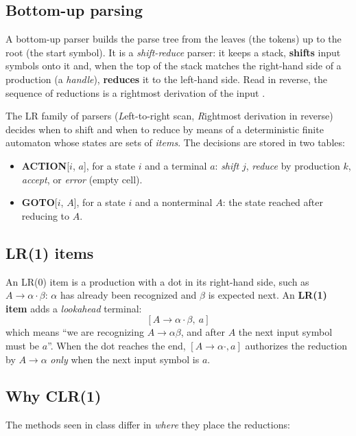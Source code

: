 \documentclass[11pt,letterpaper]{article}
\let\oldsubsection\subsection
\renewcommand{\subsection}{\needspace{6\baselineskip}\oldsubsection}
\begin{document}
\subsection{Bottom-up parsing}

A bottom-up parser builds the parse tree from the leaves (the tokens) up to
the root (the start symbol). It is a \emph{shift-reduce} parser: it keeps a
stack, \textbf{shifts} input symbols onto it and, when the top of the stack
matches the right-hand side of a production (a \emph{handle}),
\textbf{reduces} it to the left-hand side. Read in reverse, the sequence of
reductions is a rightmost derivation of the input \cite{aho2006}.

The LR family of parsers (\emph{L}eft-to-right scan, \emph{R}ightmost
derivation in reverse) decides when to shift and when to reduce by means of a
deterministic finite automaton whose states are sets of \emph{items}. The
decisions are stored in two tables:
\begin{itemize}
  \item \textbf{ACTION}[$i$, $a$], for a state $i$ and a terminal $a$:
        \emph{shift} $j$, \emph{reduce} by production $k$, \emph{accept}, or
        \emph{error} (empty cell).
  \item \textbf{GOTO}[$i$, $A$], for a state $i$ and a nonterminal $A$: the
        state reached after reducing to $A$.
\end{itemize}

\subsection{LR(1) items}

An LR(0) item is a production with a dot in its right-hand side, such as
$A\to\alpha\cdot\beta$: $\alpha$ has already been recognized and $\beta$ is
expected next. An \textbf{LR(1) item} adds a \emph{lookahead} terminal:
\[
[A\to\alpha\cdot\beta,\ a]
\]
which means ``we are recognizing $A\to\alpha\beta$, and after $A$ the next
input symbol must be $a$''. When the dot reaches the end, $[A\to\alpha\cdot,a]$
authorizes the reduction by $A\to\alpha$ \emph{only} when the next input
symbol is $a$.

\subsection{Why CLR(1)}

The methods seen in class differ in \emph{where} they place the reductions:
\end{document}
